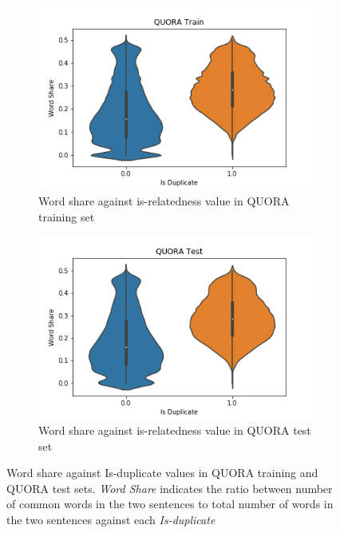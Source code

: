 \begin{enumerate}
\begin{figure}
	\captionsetup[subfigure]{justification=centering}
	\centering
	\begin{subfigure}[b]{.5\textwidth}
		\centering
		\includegraphics[width=\textwidth]{figures/semantic_textual_similarity/introduction/quora_train_word_share.png}
		\caption{Word share against is-relatedness value in QUORA training set}
		\label{fig:quora_train_word_share}
	\end{subfigure}%
	\begin{subfigure}[b]{.5\textwidth}
		\centering
		\includegraphics[width=\textwidth]{figures/semantic_textual_similarity/introduction/quora_test_word_share.png}
		\caption{Word share against is-relatedness value in QUORA test set}
		\label{fig:quora_test_word_share}
	\end{subfigure}
	\caption[Word share against Is-duplicate values in QUORA training and QUORA test sets.]{Word share against Is-duplicate values in QUORA training and QUORA test sets. \textit{Word Share} indicates the ratio between number of common words in the two sentences to total number of words in the two sentences against each \textit{Is-duplicate}}
	\label{fig:quora_word_share}
\end{figure}


\end{enumerate}
